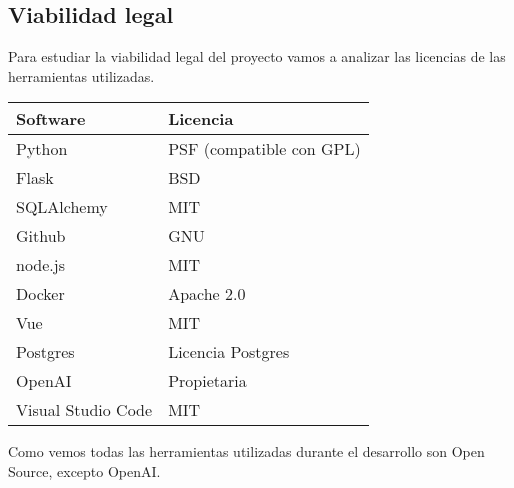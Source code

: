 \subsection{Viabilidad legal}

Para estudiar la viabilidad legal del proyecto vamos a analizar las licencias de las
herramientas utilizadas.

\begin{tabular}{l l}
    \hline
    \textbf{Software} & \textbf{Licencia}\\ \hline
    Python & PSF (compatible con GPL) \\ \hline
    Flask & BSD\\ \hline
    SQLAlchemy & MIT\\ \hline
    Github & GNU\\ \hline
    node.js & MIT\\ \hline
    Docker & Apache 2.0\\ \hline
    Vue & MIT\\ \hline
    Postgres & Licencia Postgres\\ \hline
    OpenAI & Propietaria\\ \hline
    Visual Studio Code & MIT \\ \hline
\end{tabular}

Como vemos todas las herramientas utilizadas durante el desarrollo son Open Source, 
excepto OpenAI.